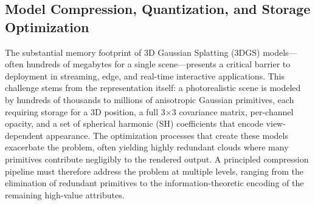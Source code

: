 \documentclass[11pt,a4paper]{article}
\begin{document}
\subsection{Model Compression, Quantization, and Storage Optimization}


The substantial memory footprint of 3D Gaussian Splatting (3DGS) models---often hundreds of megabytes for a single scene---presents a critical barrier to deployment in streaming, edge, and real-time interactive applications. This challenge stems from the representation itself: a photorealistic scene is modeled by hundreds of thousands to millions of anisotropic Gaussian primitives, each requiring storage for a 3D position, a full 3$\times$3 covariance matrix, per-channel opacity, and a set of spherical harmonic (SH) coefficients that encode view-dependent appearance. The optimization processes that create these models exacerbate the problem, often yielding highly redundant clouds where many primitives contribute negligibly to the rendered output. A principled compression pipeline must therefore address the problem at multiple levels, ranging from the elimination of redundant primitives to the information-theoretic encoding of the remaining high-value attributes.
\end{document}

